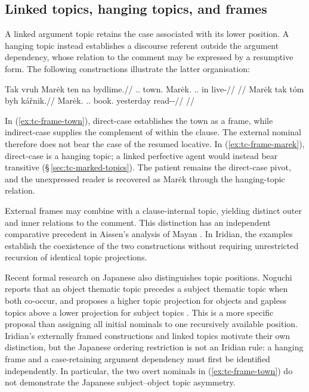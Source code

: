 \subsection{Linked topics, hanging topics, and frames}
\label{sec:tc-multiple-topics}

A linked argument topic retains the case associated with its lower position.
 A hanging topic instead establishes a discourse referent outside the argument
 dependency, whose relation to the comment may be expressed by a resumptive
 form. The following constructions illustrate the latter organisation:

\pex\label{ex:tc-frame-top}
\a\label{ex:tc-frame-town}%
\begingl
\gla Tak vruh Marėk ten na bydlime.//
\glb \Dem{}.\Prox{}.\Dir{} town.\Dir{} Marėk.\Dir{} \Dem{}.\Prox{}.\Ind{} in live-\Prog{}//
\glft {}
      //
\endgl
\a\label{ex:tc-frame-marek}%
\begingl
\gla Marėk tak tóm byh kářnik.//
\glb Marėk.\Dir{} \Dem{}.\Prox{}.\Dir{} book.\Dir{} yesterday read-\Trs{}-\Pf{}//
\glft {}
      //
\endgl
\xe

\noindent In (\ref{ex:tc-frame-town}), direct-case  establishes
 the town as a frame, while indirect-case  supplies the complement of
  within the clause. The external nominal therefore does not bear the
 case of the resumed locative. In (\ref{ex:tc-frame-marek}), direct-case
  is a hanging topic; a linked perfective agent would instead bear
 transitive  (§\,\ref{sec:tc-marked-topics}). The patient
  remains the direct-case pivot, and the unexpressed reader is
 recovered as Marėk through the hanging-topic relation.

External frames may combine with a clause-internal topic, yielding distinct
 outer and inner relations to the comment. This distinction has an independent
 comparative precedent in Aissen's analysis of Mayan \cite{aissen1992}.
 In Iridian, the examples establish the coexistence of the two constructions
 without requiring unrestricted recursion of identical topic projections.

Recent formal research on Japanese also distinguishes topic positions.
Noguchi reports that an object thematic topic precedes a subject thematic
topic when both co-occur, and proposes a higher topic projection for objects
and gapless topics above a lower projection for subject topics
\cite[§§\,2.1, 3--5]{noguchi2025}. This is a more specific proposal than
assigning all initial nominals to one recursively available position.
Iridian's externally framed constructions and linked topics motivate their
own distinction, but the Japanese ordering restriction is not an Iridian
rule: a hanging frame and a case-retaining argument dependency must first be
identified independently. In particular, the two overt nominals in
(\ref{ex:tc-frame-town}) do not demonstrate the Japanese subject--object
topic asymmetry.

